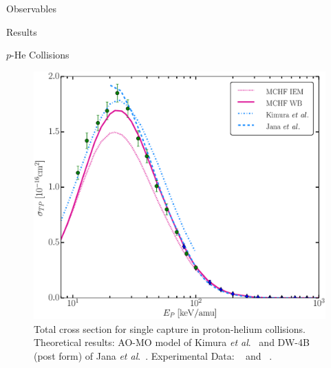 \documentclass[letterpaper, 11 pt]{report}
\begin{document}
\begin{chapter}{Observables \label{chap:p-he2p-he}}
\begin{section}{Results \label{sec:phe2p-res}}
      \begin{subsection}{\texorpdfstring{$p$}{p}-He Collisions \label{sec:phe-res}}

         \begin{figure}[ht]
            \begin{minipage}{.49\linewidth}
               
               \centering
               \includegraphics[width = \linewidth]{./images/phe/phe-TP.eps}
               \caption[Total cross section for single capture in proton-helium collisions.]
                       {Total cross section for single capture in proton-helium collisions.
                        Theoretical results: AO-MO model of Kimura \textit{et al}.~\cite{KL-86} and
                        DW-4B (post form) of Jana \textit{et al}.~\cite{JMP-15}. Experimental Data:
                        {\color{OliveGreen}{$\bullet$}}~\cite{SG89} and
                        {\color{blue}{$\blacklozenge$}}~\cite{SG85}. \label{fig:phe-tp}}
            \end{minipage} \hspace{0.04\linewidth} %
            \begin{minipage}{.49\linewidth}


\end{minipage}
\end{figure}
\end{subsection}
\end{section}
\end{chapter}
\end{document}
